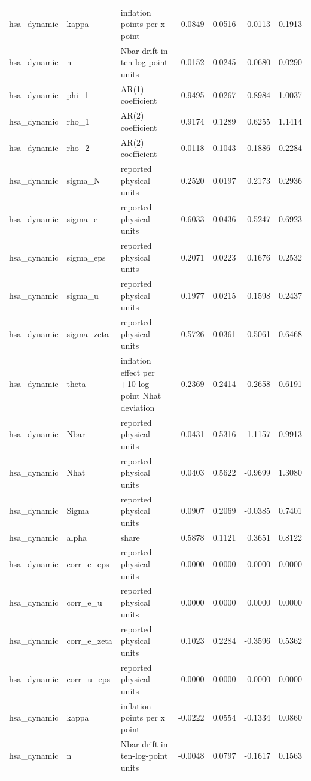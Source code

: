 \begin{tabular}{lllrrrr}
hsa\_dynamic & kappa & inflation points per x point & 0.0849 & 0.0516 & -0.0113 & 0.1913 \\
hsa\_dynamic & n & Nbar drift in ten-log-point units & -0.0152 & 0.0245 & -0.0680 & 0.0290 \\
hsa\_dynamic & phi\_1 & AR(1) coefficient & 0.9495 & 0.0267 & 0.8984 & 1.0037 \\
hsa\_dynamic & rho\_1 & AR(2) coefficient & 0.9174 & 0.1289 & 0.6255 & 1.1414 \\
hsa\_dynamic & rho\_2 & AR(2) coefficient & 0.0118 & 0.1043 & -0.1886 & 0.2284 \\
hsa\_dynamic & sigma\_N & reported physical units & 0.2520 & 0.0197 & 0.2173 & 0.2936 \\
hsa\_dynamic & sigma\_e & reported physical units & 0.6033 & 0.0436 & 0.5247 & 0.6923 \\
hsa\_dynamic & sigma\_eps & reported physical units & 0.2071 & 0.0223 & 0.1676 & 0.2532 \\
hsa\_dynamic & sigma\_u & reported physical units & 0.1977 & 0.0215 & 0.1598 & 0.2437 \\
hsa\_dynamic & sigma\_zeta & reported physical units & 0.5726 & 0.0361 & 0.5061 & 0.6468 \\
hsa\_dynamic & theta & inflation effect per +10 log-point Nhat deviation & 0.2369 & 0.2414 & -0.2658 & 0.6191 \\
hsa\_dynamic & Nbar & reported physical units & -0.0431 & 0.5316 & -1.1157 & 0.9913 \\
hsa\_dynamic & Nhat & reported physical units & 0.0403 & 0.5622 & -0.9699 & 1.3080 \\
hsa\_dynamic & Sigma & reported physical units & 0.0907 & 0.2069 & -0.0385 & 0.7401 \\
hsa\_dynamic & alpha & share & 0.5878 & 0.1121 & 0.3651 & 0.8122 \\
hsa\_dynamic & corr\_e\_eps & reported physical units & 0.0000 & 0.0000 & 0.0000 & 0.0000 \\
hsa\_dynamic & corr\_e\_u & reported physical units & 0.0000 & 0.0000 & 0.0000 & 0.0000 \\
hsa\_dynamic & corr\_e\_zeta & reported physical units & 0.1023 & 0.2284 & -0.3596 & 0.5362 \\
hsa\_dynamic & corr\_u\_eps & reported physical units & 0.0000 & 0.0000 & 0.0000 & 0.0000 \\
hsa\_dynamic & kappa & inflation points per x point & -0.0222 & 0.0554 & -0.1334 & 0.0860 \\
hsa\_dynamic & n & Nbar drift in ten-log-point units & -0.0048 & 0.0797 & -0.1617 & 0.1563 \\

\end{tabular}
